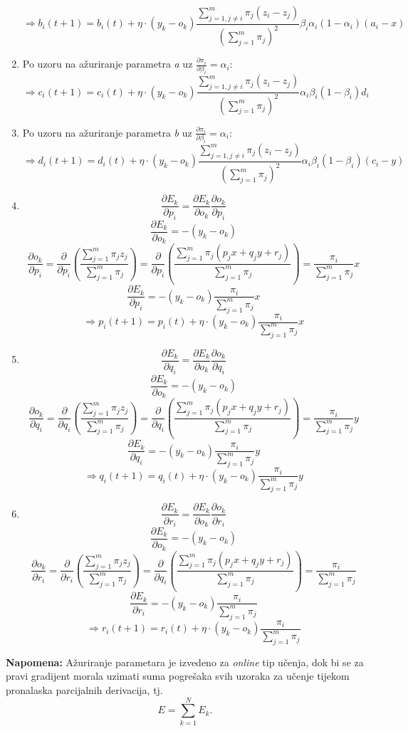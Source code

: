 \documentclass[times, utf8, seminar]{fer}
\begin{document}
\begin{enumerate}
        \[\Longrightarrow b_i(t+1) = b_i(t) + \eta \cdot (y_k-o_k)\frac{\sum_{j=1,j \neq i}^{m} \pi_j(z_i-z_j)}{(\sum_{j=1}^{m} \pi_j)^2}\beta_i\alpha_i(1-\alpha_i)(a_i-x)\]
    \item Po uzoru na ažuriranje parametra \textit{a} uz $\frac{\partial \pi_i}{\partial \beta_i} = \alpha_i$:
        \[\Longrightarrow c_i(t+1) = c_i(t) + \eta \cdot (y_k-o_k)\frac{\sum_{j=1,j \neq i}^{m} \pi_j(z_i-z_j)}{(\sum_{j=1}^{m} \pi_j)^2}\alpha_i\beta_i(1-\beta_i)d_i\]
    \item Po uzoru na ažuriranje parametra \textit{b} uz $\frac{\partial \pi_i}{\partial \beta_i} = \alpha_i$:
        \[\Longrightarrow d_i(t+1) = d_i(t) + \eta \cdot (y_k-o_k)\frac{\sum_{j=1,j \neq i}^{m} \pi_j(z_i-z_j)}{(\sum_{j=1}^{m} \pi_j)^2}\alpha_i\beta_i(1-\beta_i)(c_i-y)\]
    \item
         \[\frac{\partial E_k}{\partial p_i} = \frac{\partial E_k}{\partial o_k} \frac{\partial o_k}{\partial p_i}\]
         \[\frac{\partial E_k}{\partial o_k} = -(y_k-o_k)\]
         \[\frac{\partial o_k}{\partial p_i} = \frac{\partial}{\partial p_i}(\frac{\sum_{j=1}^{m} \pi_jz_j}{\sum_{j=1}^{m} \pi_j}) = \frac{\partial}{\partial p_i}(\frac{\sum_{j=1}^{m} \pi_j(p_jx + q_jy + r_j)}{\sum_{j=1}^{m} \pi_j}) = \frac{\pi_i}{\sum_{j=1}^{m} \pi_j}x\]
         \[\frac{\partial E_k}{\partial p_i} = -(y_k-o_k)\frac{\pi_i}{\sum_{j=1}^{m} \pi_j}x\]
         \[\Longrightarrow p_i(t+1) = p_i(t) + \eta \cdot (y_k-o_k)\frac{\pi_i}{\sum_{j=1}^{m} \pi_j}x\]
    \item
         \[\frac{\partial E_k}{\partial q_i} = \frac{\partial E_k}{\partial o_k} \frac{\partial o_k}{\partial q_i}\]
         \[\frac{\partial E_k}{\partial o_k} = -(y_k-o_k)\]
         \[\frac{\partial o_k}{\partial q_i} = \frac{\partial}{\partial q_i}(\frac{\sum_{j=1}^{m} \pi_jz_j}{\sum_{j=1}^{m} \pi_j}) = \frac{\partial}{\partial q_i}(\frac{\sum_{j=1}^{m} \pi_j(p_jx + q_jy + r_j)}{\sum_{j=1}^{m} \pi_j}) = \frac{\pi_i}{\sum_{j=1}^{m} \pi_j}y\]
         \[\frac{\partial E_k}{\partial q_i} = -(y_k-o_k)\frac{\pi_i}{\sum_{j=1}^{m} \pi_j}y\]
         \[\Longrightarrow q_i(t+1) = q_i(t) + \eta \cdot (y_k-o_k)\frac{\pi_i}{\sum_{j=1}^{m} \pi_j}y\]
    \item
         \[\frac{\partial E_k}{\partial r_i} = \frac{\partial E_k}{\partial o_k} \frac{\partial o_k}{\partial r_i}\]
         \[\frac{\partial E_k}{\partial o_k} = -(y_k-o_k)\]
         \[\frac{\partial o_k}{\partial r_i} = \frac{\partial}{\partial r_i}(\frac{\sum_{j=1}^{m} \pi_jz_j}{\sum_{j=1}^{m} \pi_j}) = \frac{\partial}{\partial q_i}(\frac{\sum_{j=1}^{m} \pi_j(p_jx + q_jy + r_j)}{\sum_{j=1}^{m} \pi_j}) = \frac{\pi_i}{\sum_{j=1}^{m} \pi_j}\]
         \[\frac{\partial E_k}{\partial r_i} = -(y_k-o_k)\frac{\pi_i}{\sum_{j=1}^{m} \pi_j}\]
         \[\Longrightarrow r_i(t+1) = r_i(t) + \eta \cdot (y_k-o_k)\frac{\pi_i}{\sum_{j=1}^{m} \pi_j}\]
\end{enumerate}
\textbf{Napomena:} Ažuriranje parametara je izvedeno za \textit{online} tip učenja, dok bi se za pravi gradijent morala uzimati suma pogrešaka svih uzoraka za učenje tijekom pronalaska parcijalnih derivacija, tj.
\[E = \sum_{k=1}^{N} E_k.\]
\end{document}
